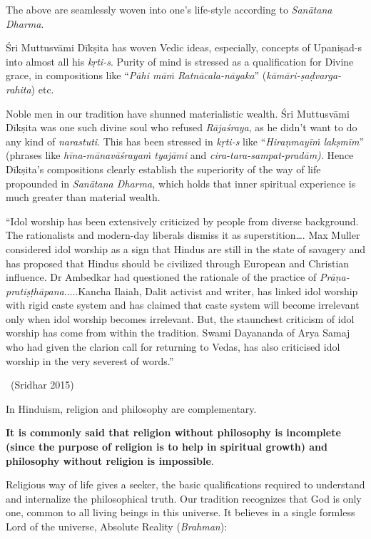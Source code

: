 \vspace{-.4cm}

The above are seamlessly woven into one’s life-style according to \textit{Sanātana Dharma}.

Śri Muttusvāmi Dīkṣita has woven Vedic ideas, especially, concepts of Upaniṣad-s into almost all his \textit{kṛti-s}. Purity of mind is stressed as a qualification for Divine grace, in compositions like “\textit{Pāhi māṁ Ratnācala-nāyaka}” (\textit{kāmāri-ṣaḍvarga-rahita}) etc.

Noble men in our tradition have shunned materialistic wealth. Śri Muttusvāmi Dīkṣita was one such divine soul who refused \textit{Rājaśraya}, as he didn’t want to do any kind of \textit{narastuti}. This has been stressed in \textit{kṛti-s} like “\textit{Hiraṇmayīṁ lakṣmīm}” (phrases like \textit{hīna-mānavāśrayaṁ tyajāmi} and \textit{cira-tara-sampat-pradām)}. Hence Dīkṣita’s compositions clearly establish the superiority of the way of life propounded in \textit{Sanātana Dharma,} which holds that inner spiritual experience is much greater than material wealth.

\begin{myquote}
“Idol worship has been extensively criticized by people from diverse background. The rationalists and modern-day liberals dismiss it as superstition…. Max Muller considered idol worship as a sign that Hindus are still in the state of savagery and has proposed that Hindus should be civilized through European and Christian influence. Dr Ambedkar had questioned the rationale of the practice of \textit{Prāṇa-pratiṣṭhāpana}.....Kancha Ilaiah, Dalit activist and writer, has linked idol worship with rigid caste system and has claimed that caste system will become irrelevant only when idol worship becomes irrelevant. But, the staunchest criticism of idol worship has come from within the tradition. Swami Dayananda of Arya Samaj who had given the clarion call for returning to Vedas, has also criticised idol worship in the very severest of words.” 

~\hfill (Sridhar 2015)
\end{myquote}

In Hinduism, religion and philosophy are complementary.

\textbf{It is commonly said that religion without philosophy is incomplete (since the purpose of religion is to help in spiritual growth) and philosophy without religion is impossible}.

Religious way of life gives a seeker, the basic qualifications required to understand and internalize the philosophical truth. Our tradition recognizes that God is only one, common to all living beings in this universe. It believes in a single formless Lord of the universe, Absolute Reality (\textit{Brahman}):


